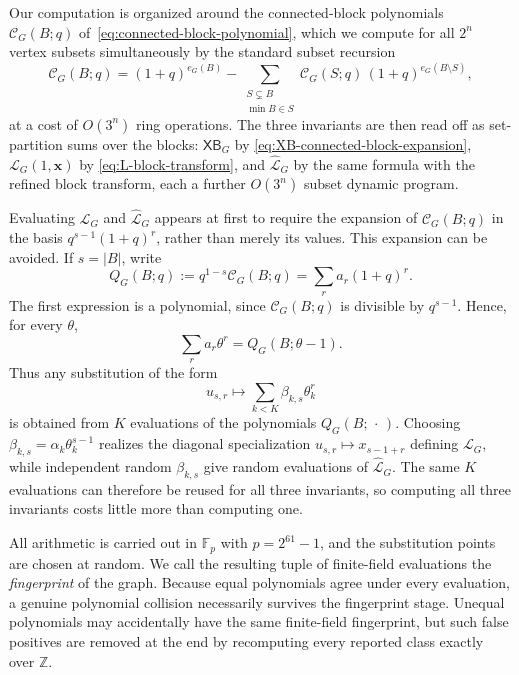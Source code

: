 \documentclass[11pt]{article}
\theoremstyle{plain}
\theoremstyle{definition}
\renewcommand{\mathcal}{\mathscr}
\newcommand{\LL}{\mathcal{L}}    %
\newcommand{\cC}{\mathcal{C}}    %
\newcommand{\bx}{\mathbf{x}}
\newcommand{\XB}{\mathsf{XB}} %
\newcommand{\FF}{\mathbb F}
\newcommand{\ZZ}{\mathbb Z}
\numberwithin{equation}{section}
\begin{document}
Our computation is organized around the connected-block polynomials $\cC_G(B;q)$
of~\eqref{eq:connected-block-polynomial}, which we compute for all $2^{n}$ vertex subsets
simultaneously by the standard subset recursion
\[
   \cC_G(B;q)
   =
   (1+q)^{e_G(B)}
   -\!\!\sum_{\substack{S\subsetneq B\\ \min B\in S}}\!\!
   \cC_G(S;q)\,(1+q)^{e_G(B\setminus S)},
\]
at a cost of $O(3^{n})$ ring operations.  The three invariants are then read
off as set-partition sums over the blocks: $\XB_G$ by
\eqref{eq:XB-connected-block-expansion}, $\LL_G(1,\bx)$ by
\eqref{eq:L-block-transform}, and $\widehat{\LL}_G$ by the same formula with
the refined block transform, each a further $O(3^{n})$ subset dynamic program.

Evaluating $\LL_G$ and $\widehat{\LL}_G$ appears at first to require the
expansion of $\cC_G(B;q)$ in the basis $q^{s-1}(1+q)^r$, rather than merely
its values.  This expansion can be avoided.  If $s=|B|$, write
\[
  Q_G(B;q)  :=   q^{1-s}\cC_G(B;q)   =   \sum_r a_r(1+q)^r.
\]
The first expression is a polynomial, since $\cC_G(B;q)$ is divisible by $q^{s-1}$.
Hence, for every $\theta$,
\begin{equation}\label{eq:evaluation-trick}
  \sum_r a_r\theta^r   =   Q_G(B;\theta-1).
\end{equation}
Thus any substitution of the form
\[
  u_{s,r}\longmapsto  \sum_{k<K}\beta_{k,s}\theta_k^r
\]
is obtained from $K$ evaluations of the polynomials $Q_G(B;\,\cdot\,)$.
Choosing $\beta_{k,s}=\alpha_k\theta_k^{s-1}$ realizes the diagonal specialization
$u_{s,r}\mapsto x_{s-1+r}$ defining $\LL_G$, while independent random
$\beta_{k,s}$ give random evaluations of $\widehat{\LL}_G$.  The same
$K$ evaluations can therefore be reused for all three invariants,
so computing all three invariants costs little more than computing one.


All arithmetic is carried out in $\FF_p$ with $p=2^{61}-1$, and the substitution points are chosen at random.
We call the resulting tuple of finite-field evaluations the \emph{fingerprint} of the graph.
Because equal polynomials agree under every evaluation, a genuine polynomial collision
necessarily survives the fingerprint stage.  Unequal polynomials may accidentally have
the same finite-field fingerprint, but such false positives are removed at the end by recomputing
every reported class exactly over $\ZZ$.
\end{document}

